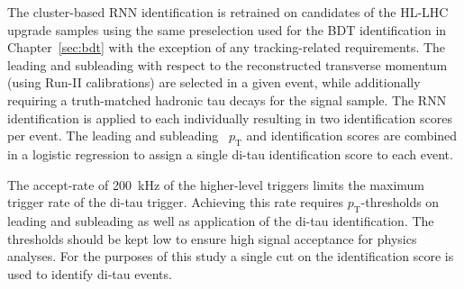The cluster-based RNN identification is retrained on \tauhadvis candidates of
the HL-LHC upgrade samples using the same preselection used for the BDT
identification in Chapter~\ref{sec:bdt} with the exception of any
tracking-related requirements. The leading and subleading \tauhadvis with
respect to the reconstructed transverse momentum (using Run-II calibrations) are
selected in a given event, while additionally requiring a truth-matched hadronic
tau decays for the signal sample. The RNN identification is applied to each
\tauhadvis individually resulting in two identification scores per event. The
leading and subleading \tauhadvis~$p_\text{T}$ and identification scores are
combined in a logistic regression to assign a single di-tau identification score
to each event.

The accept-rate of \SI{200}{\kilo\hertz} of the higher-level triggers limits the
maximum trigger rate of the di-tau trigger. Achieving this rate requires
$p_\text{T}$-thresholds on leading and subleading \tauhadvis as well as
application of the di-tau identification. The thresholds should be kept low to
ensure high signal acceptance for physics analyses. For the purposes of this
study a single cut on the identification score is used to identify di-tau
events.

